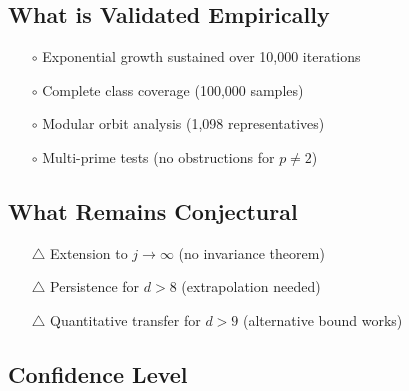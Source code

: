 \documentclass[11pt,a4paper]{article}
\theoremstyle{plain}
\theoremstyle{definition}
\begin{document}
\subsection{What is Validated Empirically}

\begin{enumerate}
\item[\textcolor{observed}{$\circ$}] Exponential growth sustained over 10,000 iterations
\item[\textcolor{observed}{$\circ$}] Complete class coverage (100,000 samples)
\item[\textcolor{observed}{$\circ$}] Modular orbit analysis (1,098 representatives)
\item[\textcolor{observed}{$\circ$}] Multi-prime tests (no obstructions for $p \neq 2$)
\end{enumerate}

\subsection{What Remains Conjectural}

\begin{enumerate}
\item[\textcolor{conjectural}{$\triangle$}] Extension to $j \to \infty$ (no invariance theorem)
\item[\textcolor{conjectural}{$\triangle$}] Persistence for $d > 8$ (extrapolation needed)
\item[\textcolor{conjectural}{$\triangle$}] Quantitative transfer for $d > 9$ (alternative bound works)
\end{enumerate}

\subsection{Confidence Level}

\begin{center}
\end{center}
\end{document}
